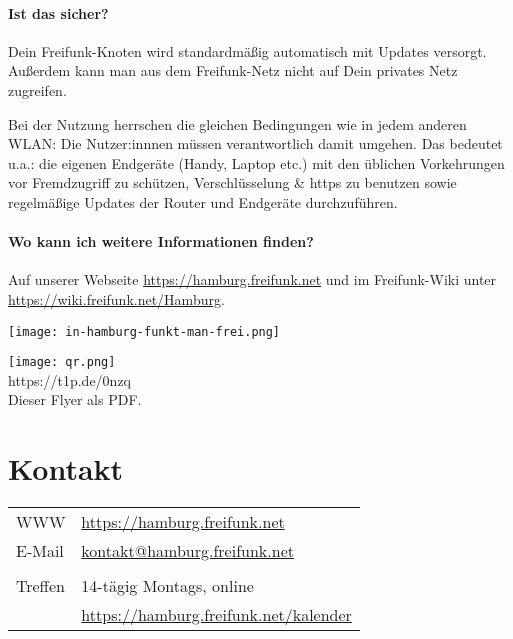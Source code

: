 \documentclass[10pt,a4paper,notumble]{leaflet}
\begin{document}
\paragraph{Ist das sicher?} Dein Freifunk-Knoten wird standardmäßig automatisch mit Updates versorgt. Außerdem kann man aus dem Freifunk-Netz nicht auf Dein privates Netz zugreifen.

Bei der Nutzung herrschen die gleichen Bedingungen wie in jedem anderen WLAN: Die Nutzer:innnen müssen verantwortlich damit umgehen. Das bedeutet u.a.: die eigenen Endgeräte (Handy, Laptop etc.) mit den üblichen Vorkehrungen vor Fremdzugriff zu schützen, Verschlüsselung \& https zu benutzen sowie regelmäßige Updates der Router und Endgeräte durchzuführen.

\paragraph{Wo kann ich weitere Informationen finden?} Auf unserer Webseite \href{https://hamburg.freifunk.net}{https://hamburg.freifunk.net} und im Freifunk-Wiki unter \href{https://wiki.freifunk.net/Hamburg}{https://wiki.freifunk.net/Hamburg}.

\newpage
\begin{center}
\texttt{[image: in-hamburg-funkt-man-frei.png]}
\end{center}
\vspace{3em}
\begin{center}
\texttt{[image: qr.png]}\\
\footnotesize https://t1p.de/0nzq\\Dieser Flyer als PDF.
\end{center}
\vfill
\section{Kontakt}
\begin{tabular}{ll}
WWW & \mbox{\href{https://hamburg.freifunk.net}{https://hamburg.freifunk.net}}\\
E-Mail & \mbox{\href{mailto:kontakt@hamburg.freifunk.net}{kontakt@hamburg.freifunk.net}}\\
        \\
Treffen & 14-tägig Montags, online\\
	& \mbox{\href{https://hamburg.freifunk.net/kalender}{https://hamburg.freifunk.net/kalender}}
\end{tabular}
\end{document}
